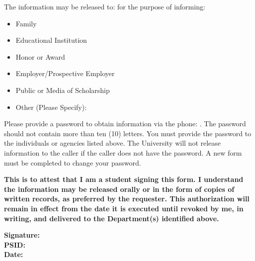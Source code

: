 \documentclass[12pt]{article}
\begin{document}
The information may be released to: \underline{\hspace{5cm}} for the purpose of informing:

\begin{itemize}
    \item \checkbox{} Family
    \item \checkbox{} Educational Institution
    \item \checkbox{} Honor or Award
    \item \checkbox{} Employer/Prospective Employer
    \item \checkbox{} Public or Media of Scholarship
    \item \checkbox{} Other (Please Specify): \underline{\hspace{3cm}}
\end{itemize}

Please provide a password to obtain information via the phone:
\underline{\hspace{3cm}}. The password should not contain more than ten (10) letters. You must provide the password to the individuals or agencies listed above. The University will not release information to the caller if the caller does not have the password. A new form must be completed to change your password.

\textbf{This is to attest that I am a student signing this form. I understand the information may be released orally or in the form of copies of written records, as preferred by the requester. This authorization will remain in effect from the date it is executed until revoked by me, in writing, and delivered to the Department(s) identified above.}

\begin{flushright}
\textbf{Signature:} \underline{\hspace{3cm}} \\
\textbf{PSID:} \underline{\hspace{3cm}} \\
\textbf{Date:} \underline{\hspace{3cm}} 
\end{flushright}
\end{document}

